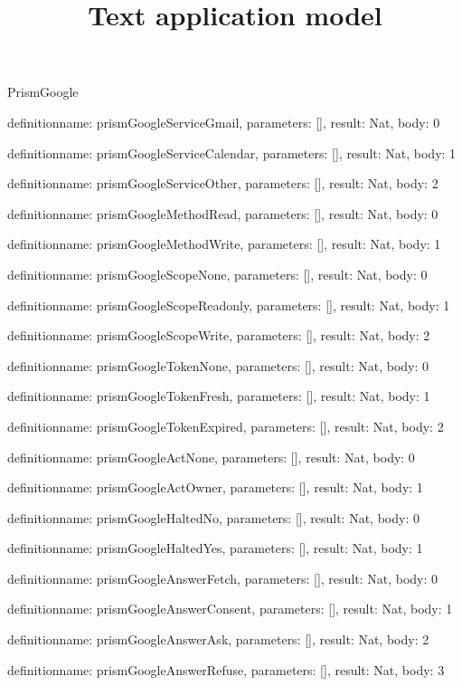 \begin{lexlean}{PrismGoogle}
\title{Text application model}
\begin{semanticmodule}
definition{name: prismGoogleServiceGmail, parameters: [], result: Nat, body: 0}

definition{name: prismGoogleServiceCalendar, parameters: [], result: Nat, body: 1}

definition{name: prismGoogleServiceOther, parameters: [], result: Nat, body: 2}

definition{name: prismGoogleMethodRead, parameters: [], result: Nat, body: 0}

definition{name: prismGoogleMethodWrite, parameters: [], result: Nat, body: 1}

definition{name: prismGoogleScopeNone, parameters: [], result: Nat, body: 0}

definition{name: prismGoogleScopeReadonly, parameters: [], result: Nat, body: 1}

definition{name: prismGoogleScopeWrite, parameters: [], result: Nat, body: 2}

definition{name: prismGoogleTokenNone, parameters: [], result: Nat, body: 0}

definition{name: prismGoogleTokenFresh, parameters: [], result: Nat, body: 1}

definition{name: prismGoogleTokenExpired, parameters: [], result: Nat, body: 2}

definition{name: prismGoogleActNone, parameters: [], result: Nat, body: 0}

definition{name: prismGoogleActOwner, parameters: [], result: Nat, body: 1}

definition{name: prismGoogleHaltedNo, parameters: [], result: Nat, body: 0}

definition{name: prismGoogleHaltedYes, parameters: [], result: Nat, body: 1}

definition{name: prismGoogleAnswerFetch, parameters: [], result: Nat, body: 0}

definition{name: prismGoogleAnswerConsent, parameters: [], result: Nat, body: 1}

definition{name: prismGoogleAnswerAsk, parameters: [], result: Nat, body: 2}

definition{name: prismGoogleAnswerRefuse, parameters: [], result: Nat, body: 3}


\end{semanticmodule}
\end{lexlean}
